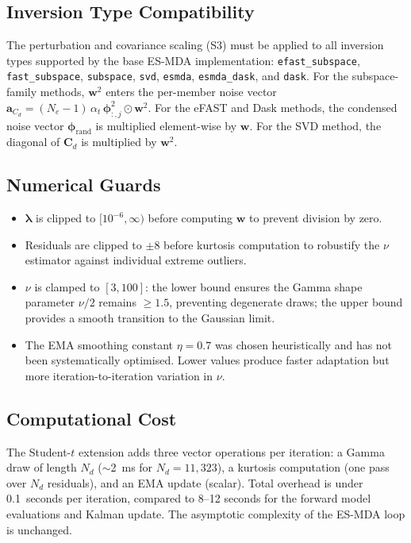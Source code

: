 \documentclass[article,nojss]{jss}
\begin{document}
\subsection{Inversion Type Compatibility}

The perturbation and covariance scaling (S3) must be applied to all
inversion types supported by the base ES-MDA implementation:
\texttt{efast\_subspace}, \texttt{fast\_subspace}, \texttt{subspace},
\texttt{svd}, \texttt{esmda}, \texttt{esmda\_dask}, and \texttt{dask}.
For the subspace-family methods, $\mathbf{w}^2$ enters the per-member
noise vector $\mathbf{a}_{C_d} = (N_e-1)\,\alpha_t\,
\boldsymbol{\phi}_{:,j}^2 \odot \mathbf{w}^2$.
For the eFAST and Dask methods, the condensed noise vector
$\boldsymbol{\phi}_{\text{rand}}$ is multiplied element-wise by
$\mathbf{w}$.
For the SVD method, the diagonal of $\mathbf{C}_d$ is multiplied by
$\mathbf{w}^2$.

\subsection{Numerical Guards}

\begin{itemize}
  \item $\boldsymbol{\lambda}$ is clipped to $[10^{-6}, \infty)$ before
        computing $\mathbf{w}$ to prevent division by zero.
  \item Residuals are clipped to $\pm 8$ before kurtosis computation
        to robustify the $\nu$ estimator against individual extreme
        outliers.
  \item $\nu$ is clamped to $[3, 100]$: the lower bound ensures the
        Gamma shape parameter $\nu/2$ remains $\geq 1.5$, preventing
        degenerate draws; the upper bound provides a smooth transition
        to the Gaussian limit.
  \item The EMA smoothing constant $\eta = 0.7$ was chosen heuristically
        and has not been systematically optimised. Lower values produce
        faster adaptation but more iteration-to-iteration variation in
        $\nu$.
\end{itemize}

\subsection{Computational Cost}

The Student-$t$ extension adds three vector operations per iteration:
a Gamma draw of length $N_d$ ($\sim$2~ms for $N_d = 11{,}323$), a
kurtosis computation (one pass over $N_d$ residuals), and an EMA update
(scalar).
Total overhead is under 0.1~seconds per iteration, compared to 8--12
seconds for the forward model evaluations and Kalman update.
The asymptotic complexity of the ES-MDA loop is unchanged.
\end{document}

